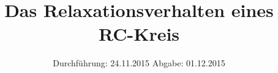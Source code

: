 

\subject{VERSUCH NUMMER 353 (Korrektur)}
\title{Das Relaxationsverhalten eines RC-Kreis }
\date{
  Durchführung: 24.11.2015
  \hspace{3em}
  Abgabe: 01.12.2015}



\maketitle
\thispagestyle{empty}
\tableofcontents
\newpage







\printbibliography


